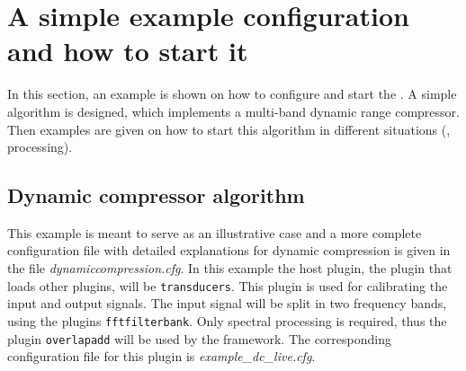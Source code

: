 
\section{A simple example configuration and how to start it}%
\label{sec:scenarios}%
%
%
%

In this section, an example is shown on how to configure and start the
\mha{}. A simple algorithm is designed, which implements a 
multi-band dynamic range compressor. Then examples are given on
how to start this algorithm in different situations (\mhad{}, \Matlab{} processing).

\subsection{Dynamic compressor algorithm}%
\label{sec:dyncmp}%

This example is meant to serve as an illustrative case and a more complete 
configuration file with detailed explanations for dynamic compression is given 
in the file \newline \emph{dynamiccompression.cfg}.
%
In this example the host plugin, the plugin that loads other plugins, 
will be \verb!transducers!. This plugin is used for calibrating the 
input and output signals.
%
The input signal will be split in two frequency bands, using the \mha{}
plugins \verb!fftfilterbank!. Only spectral processing is required, thus
the plugin \verb!overlapadd! will be
used by the framework. The corresponding configuration file for this
plugin is \emph{example\_dc\_live.cfg}.

